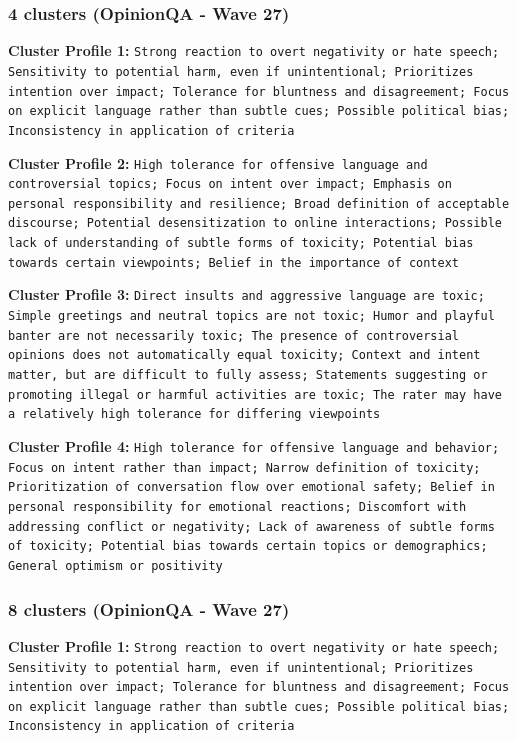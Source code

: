 \documentclass[11pt]{article}
\begin{document}
\subsubsection{4 clusters (OpinionQA - Wave 27)}


\textbf{Cluster Profile 1:} \texttt{Strong reaction to overt negativity or hate speech; Sensitivity to potential harm, even if unintentional; Prioritizes intention over impact; Tolerance for bluntness and disagreement; Focus on explicit language rather than subtle cues; Possible political bias; Inconsistency in application of criteria}


\textbf{Cluster Profile 2:} \texttt{High tolerance for offensive language and controversial topics; Focus on intent over impact; Emphasis on personal responsibility and resilience; Broad definition of acceptable discourse; Potential desensitization to online interactions; Possible lack of understanding of subtle forms of toxicity; Potential bias towards certain viewpoints; Belief in the importance of context}


\textbf{Cluster Profile 3:} \texttt{Direct insults and aggressive language are toxic; Simple greetings and neutral topics are not toxic; Humor and playful banter are not necessarily toxic; The presence of controversial opinions does not automatically equal toxicity; Context and intent matter, but are difficult to fully assess; Statements suggesting or promoting illegal or harmful activities are toxic; The rater may have a relatively high tolerance for differing viewpoints}


\textbf{Cluster Profile 4:} \texttt{High tolerance for offensive language and behavior; Focus on intent rather than impact; Narrow definition of toxicity; Prioritization of conversation flow over emotional safety; Belief in personal responsibility for emotional reactions; Discomfort with addressing conflict or negativity; Lack of awareness of subtle forms of toxicity; Potential bias towards certain topics or demographics; General optimism or positivity}


\subsubsection{8 clusters (OpinionQA - Wave 27)}


\textbf{Cluster Profile 1:} \texttt{Strong reaction to overt negativity or hate speech; Sensitivity to potential harm, even if unintentional; Prioritizes intention over impact; Tolerance for bluntness and disagreement; Focus on explicit language rather than subtle cues; Possible political bias; Inconsistency in application of criteria}
\end{document}
